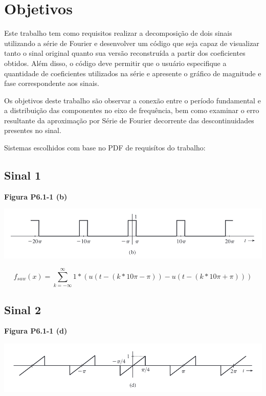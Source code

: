 \documentclass{article}
\begin{document}
\hypertarget{objetivos}{%
\section{Objetivos}\label{objetivos}}

Este trabalho tem como requisitos realizar a decomposição de dois sinais
utilizando a série de Fourier e desenvolver um código que seja capaz de
visualizar tanto o sinal original quanto sua versão reconstruída a
partir dos coeficientes obtidos. Além disso, o código deve permitir que
o usuário especifique a quantidade de coeficientes utilizados na série e
apresente o gráfico de magnitude e fase correspondente aos sinais.

Os objetivos deste trabalho são observar a conexão entre o período
fundamental e a distribuição das componentes no eixo de frequência, bem
como examinar o erro resultante da aproximação por Série de Fourier
decorrente das descontinuidades presentes no sinal.

Sistemas escolhidos com base no PDF de requisítos do trabalho:

\hypertarget{sinal-1}{%
\subsection{Sinal 1}\label{sinal-1}}

\textbf{Figura P6.1-1 (b)}

\includegraphics{assets/f1.png}

\[
f_{saw}(x) = 
  \sum_{k = -\infty}^{\infty} 
    1 * 
      (u(t - (k*10\pi - \pi)) - 
      u(t - (k*10\pi + \pi)))
\]

\hypertarget{sinal-2}{%
\subsection{Sinal 2}\label{sinal-2}}

\textbf{Figura P6.1-1 (d)}

\includegraphics{assets/f2.png}
\end{document}
